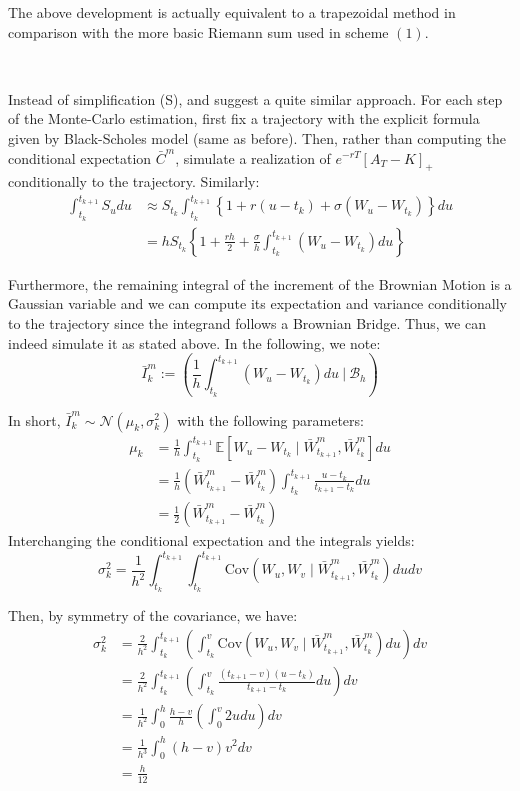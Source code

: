 \documentclass{article}
\begin{document}
The above development is actually equivalent to a trapezoidal method in comparison with the more
basic Riemann sum used in scheme $(1)$.

\

Instead of simplification (S), \cite{Bouchard} and \cite{main} suggest a quite similar approach. For each step
of the Monte-Carlo estimation, first fix a trajectory with the explicit formula given by Black-Scholes model
(same as before). Then, rather than computing the conditional expectation $\bar C^m$, simulate a realization of
$e^{-rT} \left[ A_T - K \right]_+$ conditionally to the trajectory. Similarly:
\begin{align*}
	\int_{t_k}^{t_{k+1}} S_u du
	&\approx
	S_{t_k} \int_{t_k}^{t_{k+1}} \left\{ 1 + r (u - t_k) + \sigma \left( W_u - W_{t_k} \right) \right\} du \\
	&= h S_{t_k} \left\{ 1 + \frac{rh}{2} + \frac{\sigma}{h} \int_{t_k}^{t_{k+1}} \left( W_u - W_{t_k} \right) du \right\}
\end{align*}

Furthermore, the remaining integral of the increment of the Brownian Motion is a Gaussian variable and we can
compute its expectation and variance conditionally to the trajectory since the integrand follows a Brownian Bridge.
Thus, we can indeed simulate it as stated above. In the following, we note:
\[
	\bar I_k^m := \left( \frac{1}{h}
	\int_{t_k}^{t_{k+1}} \left( W_u - W_{t_k} \right) du \ \Big\vert \ \mathcal B_h
	\right)
\]

In short, $\bar I_k^m \sim \mathcal N(\mu_k, \sigma_k^2)$ with the following parameters:
\begin{align*}
	\mu_k
	&= \frac{1}{h} \int_{t_k}^{t_{k+1}} \mathbb E \left[ W_u - W_{t_k} \mid \bar W_{t_{k+1}}^m, \bar W_{t_k}^m \right] du \\
	&= \frac{1}{h} \left( \bar W_{t_{k+1}}^m - \bar W_{t_k}^m \right) \int_{t_k}^{t_{k+1}} \frac{u - t_k}{t_{k+1} - t_k} du \\
	&= \frac{1}{2} \left( \bar W_{t_{k+1}}^m - \bar W_{t_k}^m \right)
\end{align*}
Interchanging the conditional expectation and the integrals yields:
\[
	\sigma_k^2 = \frac{1}{h^2} \int_{t_k}^{t_{k+1}} \int_{t_k}^{t_{k+1}}
		\mathrm{Cov} \left( W_u, W_v \mid \bar W_{t_{k+1}}^m, \bar W_{t_k}^m \right) du dv 
\]

\noindent Then, by symmetry of the covariance, we have:
\begin{align*}
	\sigma_k^2 &= \frac{2}{h^2} \int_{t_k}^{t_{k+1}} \left( \int_{t_k}^{v}
		\mathrm{Cov} \left( W_u, W_v \mid \bar W_{t_{k+1}}^m, \bar W_{t_k}^m \right) du \right) dv 
	 \\
	&= \frac{2}{h^2} \int_{t_k}^{t_{k+1}} \left( \int_{t_k}^{v} \frac{(t_{k+1} - v)(u - t_k)}{t_{k+1} - t_k} du \right) dv \\
	&= \frac{1}{h^2} \int_{0}^{h} \frac{h - v}{h} \left( \int_{0}^{v} 2u du \right) dv \\
	&= \frac{1}{h^3} \int_{0}^{h} (h - v) v^2 dv \\
	&= \frac{h}{12}
\end{align*}
\end{document}
